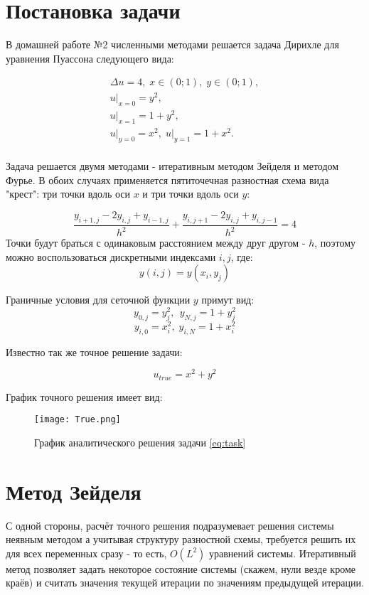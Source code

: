\section{Постановка задачи}

В домашней работе №2 численными методами решается задача Дирихле для уравнения Пуассона следующего вида:

\begin{equation}
\begin{array}{l}
\Delta{u} = 4, \; x \in (0;1), \; y \in (0;1), \\
\left.u\right|_{x = 0} = y^2, \\ \left.u\right|_{x = 1} = 1 + y^2, \\
\left.u\right|_{y = 0} = x^2, \; \left.u\right|_{y = 1} = 1 + x^2. \\
\label{eq:task}
\end{array}
\end{equation}


Задача решается двумя методами - итеративным методом Зейделя и методом Фурье. 
В обоих случаях применяется пятиточечная разностная схема вида "крест": три точки вдоль оси $x$ и три точки вдоль оси $y$:

\[ \frac{y_{i + 1, j} - 2y_{i, j} + y_{i - 1, j}}{h^2} + \frac{y_{i, j + 1} - 2y_{i, j} + y_{i, j - 1}}{h^2} = 4 \]
Точки будут браться с одинаковым расстоянием между друг другом - $h$, поэтому можно воспользоваться дискретными индексами $i,j$, где:
\[ y(i,j) = y(x_i, y_j) \]

Граничные условия для сеточной функции $y$ примут вид:
\[ y_{0, j} = y_j^2,\ \ y_{N, j} = 1 + y_j^2 \]
\[y_{i, 0} = x_i^2,\;y_{i, N} = 1 + x_i^2 \]

Известно так же точное решение задачи:

\[ u_{true} =  x^2 + y^2\]

График точного решения имеет вид:

\begin{figure}[h]
\centering
\texttt{[image: True.png]}
\caption{График аналитического решения задачи \ref{eq:task}}
\end{figure}

\newpage
\section{Метод Зейделя}

С одной стороны, расчёт точного решения подразумевает решения системы неявным методом а учитывая структуру разностной схемы, требуется решить их для всех переменных сразу - то есть, $O(L^2)$ уравнений системы. Итеративный метод позволяет задать некоторое состояние системы (скажем, нули везде кроме краёв) и считать значения текущей итерации по значениям предыдущей итерации.

